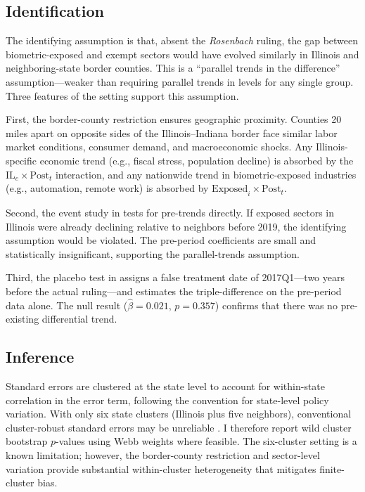 \documentclass[12pt]{article}
\begin{document}
\subsection{Identification}

The identifying assumption is that, absent the \emph{Rosenbach} ruling, the gap between biometric-exposed and exempt sectors would have evolved similarly in Illinois and neighboring-state border counties. This is a ``parallel trends in the difference'' assumption---weaker than requiring parallel trends in levels for any single group. Three features of the setting support this assumption.

First, the border-county restriction ensures geographic proximity. Counties 20 miles apart on opposite sides of the Illinois--Indiana border face similar labor market conditions, consumer demand, and macroeconomic shocks. Any Illinois-specific economic trend (e.g., fiscal stress, population decline) is absorbed by the $\text{IL}_c \times \text{Post}_t$ interaction, and any nationwide trend in biometric-exposed industries (e.g., automation, remote work) is absorbed by $\text{Exposed}_i \times \text{Post}_t$.

Second, the event study in  tests for pre-trends directly. If exposed sectors in Illinois were already declining relative to neighbors before 2019, the identifying assumption would be violated. The pre-period coefficients are small and statistically insignificant, supporting the parallel-trends assumption.

Third, the placebo test in  assigns a false treatment date of 2017Q1---two years before the actual ruling---and estimates the triple-difference on the pre-period data alone. The null result ($\hat{\beta} = 0.021$, $p = 0.357$) confirms that there was no pre-existing differential trend.

\subsection{Inference}

Standard errors are clustered at the state level to account for within-state correlation in the error term, following the convention for state-level policy variation. With only six state clusters (Illinois plus five neighbors), conventional cluster-robust standard errors may be unreliable \citep{cameron2008}. I therefore report wild cluster bootstrap $p$-values using Webb weights \citep{webb2023} where feasible. The six-cluster setting is a known limitation; however, the border-county restriction and sector-level variation provide substantial within-cluster heterogeneity that mitigates finite-cluster bias.
\end{document}
